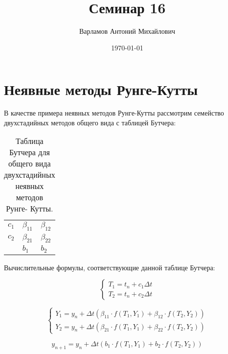 \documentclass[10pt,a4paper]{article}
\title{Семинар 16}
\date{\today}
\author{Варламов Антоний Михайлович}
\begin{document}
		\maketitle
	
	\section{Неявные методы Рунге-Кутты}
	
	
	В качестве примера неявных методов Рунге-Кутты рассмотрим семейство 
	двухстадийных методов общего вида с таблицей Бутчера:
	
	\begin{table}[h!]
\centering
\begin{tabular}{l|ll}
\multicolumn{1}{l|}{$c_{1}$}             & $\beta_{11}$             & $
\beta_{12}$ \\
\multicolumn{1}{l|}{$c_{2}$} & $\beta_{21}$ & $\beta_{22}$ \\ \hline
                                   & $b_{1}$           & $b_{2}$
\end{tabular}
\caption{Таблица Бутчера для общего вида двухстадийных неявных методов Рунге-
Кутты.}
\label{tab:Butcher_tab_example_1}
\end{table}

Вычислительные формулы, соответствующие данной таблице Бутчера:
	
	\begin{equation}
		\begin{cases}
			T_{1} = t_{n} + c_{1}\Delta t
			\\
			T_{2} = t_{n} + c_{2}\Delta t
		\end{cases}
	\end{equation}
	
	\begin{equation}
		\begin{cases}
			Y_{1} = y_{n} + \Delta t\left(\beta_{11}\cdot f\left(T_{1},Y_{1}
			\right) + \beta_{12}\cdot f\left(T_{2}, Y_{2}\right)\right)
			\\
			Y_{2} = y_{n} + \Delta t\left(\beta_{21}\cdot f\left(T_{1},Y_{1}
			\right) + \beta_{22}\cdot f\left(T_{2}, Y_{2}\right)\right)			
		\end{cases}
	\end{equation}
	
	\begin{equation}
		y_{n + 1} = y_{n} + \Delta t\left(b_{1}\cdot f\left(T_{1}, Y_{1}\right)
		+ b_{2}\cdot f\left(T_{2}, Y_{2}\right)\right)
	\end{equation}
	
\end{document}
